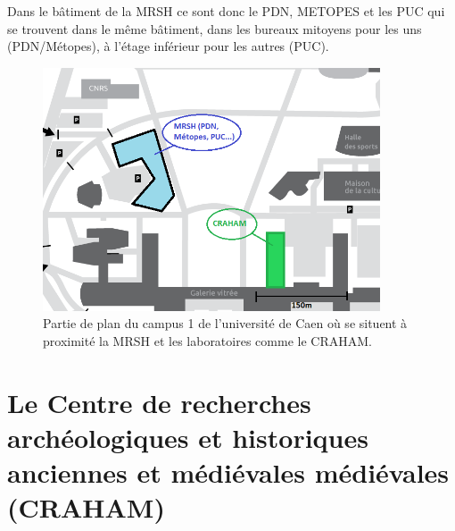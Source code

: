 \documentclass[a4paper,12pt,twoside]{book}
\begin{document}
    Dans le bâtiment de la \acrshort{MRSH} ce sont donc le \acrshort{PDN}, \acrshort{METOPES} et les \acrshort{PUC} qui se trouvent dans le même bâtiment, dans les bureaux mitoyens pour les uns (\acrshort{PDN}/Métopes), à l'étage inférieur pour les autres (\acrshort{PUC}).
    
    \begin{figure}[H]
        \centering
        \includegraphics[width=10cm]{img/partie_1/campus-univ-zoom.png}
        \caption{Partie de plan du campus 1 de l'université de Caen où se situent à proximité la \acrshort{MRSH} et les laboratoires comme le CRAHAM.}
    \end{figure}
   
    
    \section{Le Centre de recherches archéologiques et historiques anciennes et médiévales médiévales (CRAHAM)}
    
\end{document}
